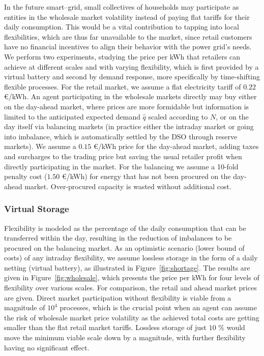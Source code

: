 \documentclass[conference]{IEEEtran}
\begin{document}
In the future smart--grid, small collectives of households may participate as entities in the wholesale market volatility instead of paying flat tariffs for their daily consumption. This would be a vital contribution to tapping into local flexibilities, which are thus far unavailable to the market, since retail customers have no financial incentives to align their behavior with the power grid's needs.
We perform two experiments, studying the price per kWh that retailers can achieve at different scales and with varying flexibility, which is first provided by a virtual battery and second by demand response, more specifically by time-shifting flexible processes. For the retail market, we assume a flat electricity tariff of $0.22$ \euro/kWh. An agent participating in the wholesale markets directly may buy either on the day-ahead market, where prices are more formidable but information is limited to the anticipated expected demand $\hat q$ scaled according to $N$, or on the day itself via balancing markets (in practice either the intraday market or going into imbalance, which is automatically settled by the DSO through reserve markets). We assume a $0.15$ \euro/kWh price for the day-ahead market, adding taxes and surcharges to the trading price but saving the usual retailer profit when directly participating in the market. For the balancing we assume a 10-fold penalty cost ($1.50$ \euro/kWh) for energy that has not been procured on the day-ahead market. Over-procured capacity is wasted without additional cost.

\subsubsection{Virtual Storage}
Flexibility is modeled as the percentage of the daily consumption that can be transferred within the day, resulting in the reduction of imbalances to be procured on the balancing market. As an optimistic scenario (lower bound of costs) of any intraday flexibility, we assume lossless storage in the form of a daily netting (virtual battery), as illustrated in Figure~\ref{fig:shortage}.
The results are given in Figure~\ref{fig:wholesale}, which presents the price per kWh for four levels of flexibility over various scales. For comparison, the retail and ahead market prices are given. Direct market participation without flexibility is viable from a magnitude of $10^4$ processes, which is the crucial point when an agent can assume the risk of wholesale market price volatility as the achieved total costs are getting smaller than the flat retail market tariffs. Lossless storage of just $10$ \% would move the minimum viable scale down by a magnitude, with further flexibility having no significant effect.
\end{document}

